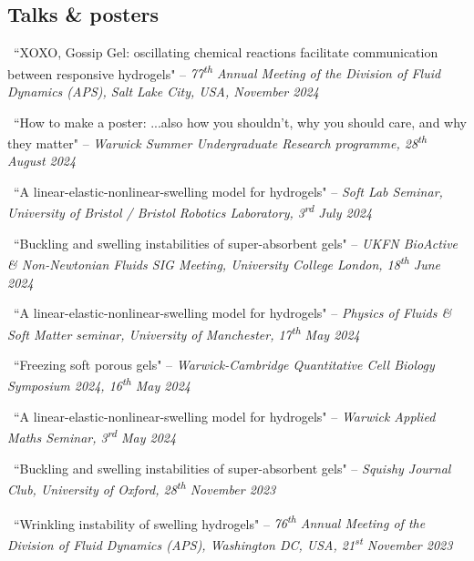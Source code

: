 \documentclass[a4paper]{article}
\begin{document}
\begin{multicols}{2}
    	\subsection*{Talks \& posters}
            \begin{small}
                \begin{itemize}
                    {\color{gray}\item \faVolumeUp \, ``XOXO, Gossip Gel: oscillating chemical reactions facilitate communication between responsive hydrogels" -- \emph{77\textsuperscript{th} Annual Meeting of the Division of Fluid Dynamics (APS), Salt Lake City, USA, November 2024}}
                    \item \faVolumeUp \, ``How to make a poster: ...also how you shouldn't, why you should care, and why they matter" -- \emph{Warwick Summer Undergraduate Research programme, 28\textsuperscript{th} August 2024}
                    \item \faVolumeUp \, ``A linear-elastic-nonlinear-swelling model for hydrogels" -- \emph{Soft Lab Seminar, University of Bristol / Bristol Robotics Laboratory, 3\textsuperscript{rd} July 2024}
                    \item \faVolumeUp \, ``Buckling and swelling instabilities of super-absorbent gels" -- \emph{UKFN BioActive \& Non-Newtonian Fluids SIG Meeting, University College London, 18\textsuperscript{th} June 2024}
                    \item \faVolumeUp \, ``A linear-elastic-nonlinear-swelling model for hydrogels" -- \emph{Physics of Fluids \& Soft Matter seminar, University of Manchester, 17\textsuperscript{th} May 2024}
                    \item \faVolumeUp \, ``Freezing soft porous gels" -- \emph{Warwick-Cambridge Quantitative Cell Biology Symposium 2024, 16\textsuperscript{th} May 2024}
                    \item \faVolumeUp \, ``A linear-elastic-nonlinear-swelling model for hydrogels" -- \emph{Warwick Applied Maths Seminar, 3\textsuperscript{rd} May 2024}
                    \item \faVolumeUp \, ``Buckling and swelling instabilities of super-absorbent gels" -- \emph{Squishy Journal Club, University of Oxford, 28\textsuperscript{th} November 2023}
                    \item \faVolumeUp \, ``Wrinkling instability of swelling hydrogels" -- \emph{76\textsuperscript{th} Annual Meeting of the Division of Fluid Dynamics (APS), Washington DC, USA, 21\textsuperscript{st} November 2023}

\end{itemize}
\end{small}
\end{multicols}
\end{document}
